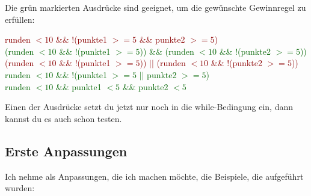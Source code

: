 \documentclass{scrartcl}   %
\begin{document}
Die grün markierten Ausdrücke sind geeignet, um die gewünschte Gewinnregel zu erfüllen:

\textcolor{darkred}{runden $< 10$ \&\& !(punkte1 $>= 5$ \&\& punkte2 $>= 5$)}\\
\textcolor{darkgreen}{(runden $< 10$ \&\& !(punkte1 $>= 5$)) \&\& (runden $< 10$ \&\& !(punkte2 $>= 5$))}\\
\textcolor{darkred}{(runden $< 10$ \&\& !(punkte1 $>= 5$)) $||$ (runden $< 10$ \&\& !(punkte2 $>= 5$))}\\
\textcolor{darkgreen}{runden $< 10$ \&\& !(punkte1 $>= 5$ $||$ punkte2 $>= 5$)}\\
\textcolor{darkgreen}{runden $< 10$ \&\& punkte1 $< 5$ \&\& punkte2 $< 5$}

\newpage

Einen der Ausdrücke setzt du jetzt nur noch in die while-Bedingung ein, dann kannst du es auch schon testen.

\subsection{Erste Anpassungen}

Ich nehme als Anpassungen, die ich machen möchte, die Beispiele, die aufgeführt wurden:
\end{document}

